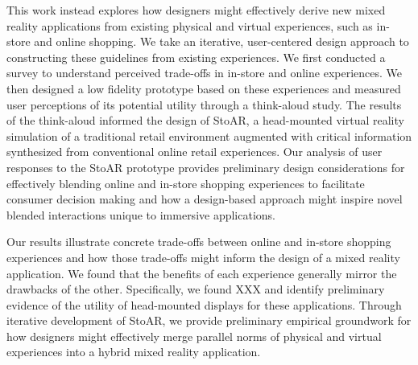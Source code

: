 

This work instead explores how designers might effectively derive new mixed reality applications from existing physical and virtual experiences, such as in-store and online shopping. 
We take an iterative, user-centered design approach to constructing these guidelines from existing experiences. We first conducted a survey to understand perceived trade-offs in in-store and online experiences. We then designed a low fidelity prototype based on these experiences and measured user perceptions of its potential utility through a think-aloud study. The results of the think-aloud informed the design of StoAR, a head-mounted virtual reality simulation of a traditional retail environment augmented with critical information synthesized from conventional online retail experiences. Our analysis of user responses to the StoAR prototype provides preliminary design considerations for effectively blending online and in-store shopping experiences to facilitate consumer decision making and how a design-based approach might inspire novel blended interactions unique to immersive applications.

Our results illustrate concrete trade-offs between online and in-store shopping experiences and how those trade-offs might inform the design of a mixed reality application. We found that the benefits of each experience generally mirror the drawbacks of the other.  Specifically, we found XXX and identify preliminary evidence of the utility of head-mounted displays for these applications. Through iterative development of StoAR, we provide preliminary empirical groundwork for how designers might effectively merge parallel norms of physical and virtual experiences into a hybrid mixed reality application. 

